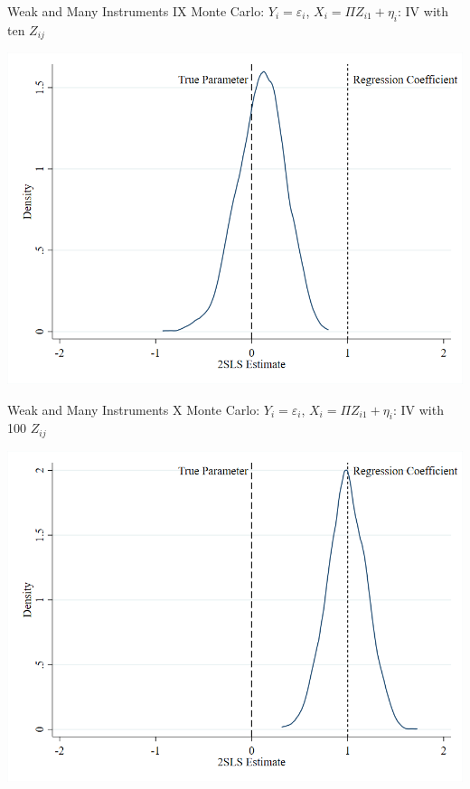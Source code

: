 \documentclass{beamer}
\begin{document}
\begin{frame}{Weak and Many Instruments IX}
\vspace{-0.2cm}
Monte Carlo: $Y_i=\varepsilon_i$, $X_i=\Pi Z_{i1}+\eta_i$: IV with ten $Z_{ij}$
\begin{center}
\includegraphics[scale=0.35]{./lecture_includes/somez.png}
\end{center}

\end{frame}

\begin{frame}{Weak and Many Instruments X}
\vspace{-0.2cm}
Monte Carlo: $Y_i=\varepsilon_i$, $X_i=\Pi Z_{i1}+\eta_i$: IV with 100 $Z_{ij}$
\begin{center}
\includegraphics[scale=0.35]{./lecture_includes/manyz.png}
\end{center}

\end{frame}
\end{document}
